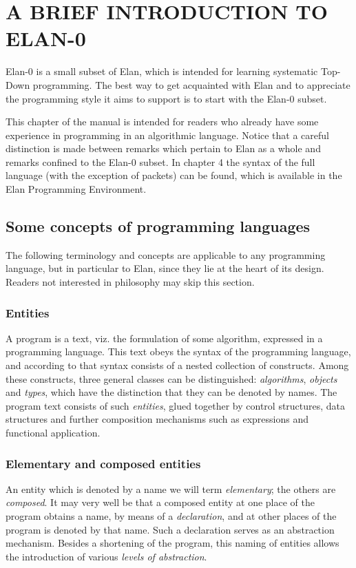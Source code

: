 \chapter{A BRIEF INTRODUCTION TO ELAN-0}

Elan-0 is a small subset of Elan, which is intended for learning
systematic Top-Down programming. The best way to get acquainted
with  Elan and to appreciate the programming style it aims to
support is to start with the Elan-0 subset.

This chapter of the manual is intended for readers who already have
some experience in programming in an algorithmic language.
Notice that a careful distinction is made between
remarks which pertain to Elan as a whole and remarks confined
to the Elan-0 subset. In chapter 4 the syntax of the full language
(with the exception of packets) can be found, which is available
in the Elan Programming Environment.

\section{Some concepts of programming languages}

The following terminology and concepts are applicable to any
programming language, but in particular to Elan, since they lie
at the heart of its design. Readers not interested in philosophy
may skip this section.

\subsection{Entities}

A program is a text, viz. the formulation of some algorithm,
expressed in a programming language. This text obeys the syntax
of the programming language, and according to that syntax consists
of a nested collection of constructs. Among these constructs,
three general classes can be distinguished: {\em algorithms},
{\em objects} and {\em types}, which have the distinction that
they can be denoted by names. The program text consists of such
{\em entities}, glued together by control structures, data structures
and further composition mechanisms such as expressions and functional
application.

\subsection{Elementary and composed entities}

An entity which is denoted by a name we will term {\em elementary};
the others are {\em composed}. It may very well be that a composed
entity at one place of the program obtains a name, by means of
a {\em declaration}, and at other places of the program is denoted
by that name. Such a declaration serves as an abstraction mechanism.
Besides a shortening of the program, this naming of entities
allows the introduction of various {\em levels of abstraction}.

